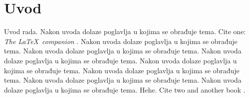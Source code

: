 \chapter{Uvod}
Uvod rada. Nakon uvoda dolaze poglavlja u kojima se obrađuje tema. Cite one: \textit{The \LaTeX\ companion} \cite{oetiket2007lshort}. Nakon uvoda dolaze poglavlja u kojima se obrađuje tema. Nakon uvoda dolaze poglavlja u kojima se obrađuje tema. Nakon uvoda dolaze poglavlja u kojima se obrađuje tema. Nakon uvoda dolaze poglavlja u kojima se obrađuje tema. Nakon uvoda dolaze poglavlja u kojima se obrađuje tema. Nakon uvoda dolaze poglavlja u kojima se obrađuje tema.
Nakon uvoda dolaze poglavlja u kojima se obrađuje tema. Hehe.
Cite two \cite{ungar2002uvod} and another book \cite{downes2002shortams}.